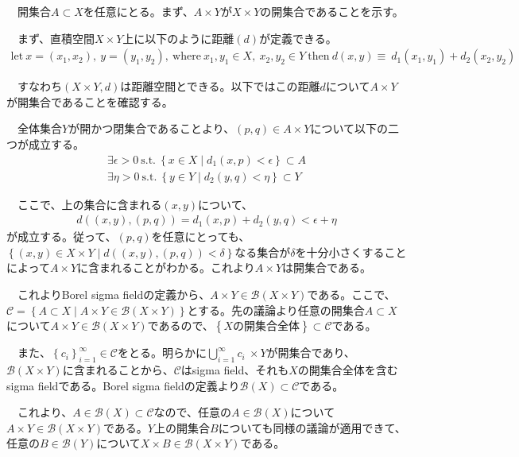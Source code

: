 \documentclass{article}
\begin{document}
　開集合$A\subset X$を任意にとる。まず、$A \times Y$が$X\times Y$の開集合であることを示す。

　まず、直積空間$X \times Y$上に以下のように距離$(d)$が定義できる。
\begin{align*}
	\text{let}\ x = (x_1, x_2),\ y = (y_1,y_2),\ \text{where}\ x_1,y_1\in X,\ x_2,y_2\in Y\ \text{then}\ d(x,y) \equiv\ d_1(x_1,y_1)+d_2(x_2,y_2)
\end{align*}

　すなわち$(X\times Y, d)$は距離空間とできる。以下ではこの距離$d$について$A \times Y$が開集合であることを確認する。

　全体集合$Y$が開かつ閉集合であることより、$(p,q)\in A\times Y$について以下の二つが成立する。
\begin{align*}
	\exists \epsilon >0\ \text{s.t.}\ \left\{ x\in X\mid d_1(x,p) < \epsilon \right\} \subset A\\
	\exists \eta >0\ \text{s.t.}\ \left\{ y\in Y\mid d_2(y,q) < \eta \right\} \subset Y
\end{align*}

　ここで、上の集合に含まれる$(x,y)$について、
\begin{align*}
	d((x,y), (p,q)) = d_1(x,p) + d_2(y, q) < \epsilon + \eta
\end{align*}
が成立する。従って、$(p,q)$を任意にとっても、$\left\{ (x, y)\in X\times Y\mid d((x,y),(p,q)) < \delta \right\}$なる集合が$\delta$を十分小さくすることによって$A\times Y$に含まれることがわかる。これより$A\times Y$は開集合である。

　これよりBorel sigma fieldの定義から、$A\times Y \in \mathcal{B}(X \times Y)$である。ここで、$\mathcal{C} = \left\{ A \subset X\mid A\times Y \in \mathcal{B}(X \times Y)\right\}$とする。先の議論より任意の開集合$A \subset X$について$A\times Y \in \mathcal{B}(X \times Y)$であるので、$\left\{ \text{$X$の開集合全体}\right\} \subset \mathcal{C}$である。

　また、$\left\{ c_i \right\}_{i=1}^{\infty} \in \mathcal{C}$をとる。明らかに$\bigcup_{i=1}^{\infty} c_i\ \times Y$が開集合であり、$\mathcal{B}(X\times Y)$に含まれることから、$\mathcal{C}$はsigma field、それも$X$の開集合全体を含むsigma fieldである。Borel sigma fieldの定義より$\mathcal{B}(X) \subset \mathcal{C}$である。

　これより、$A \in \mathcal{B}(X)\subset \mathcal{C}$なので、任意の$A\in \mathcal{B}(X)$について$A\times Y \in \mathcal{B}(X\times Y)$である。$Y$上の開集合$B$についても同様の議論が適用できて、任意の$B\in \mathcal{B}(Y)$について$X\times B\in \mathcal{B}(X\times Y)$である。
\end{document}
